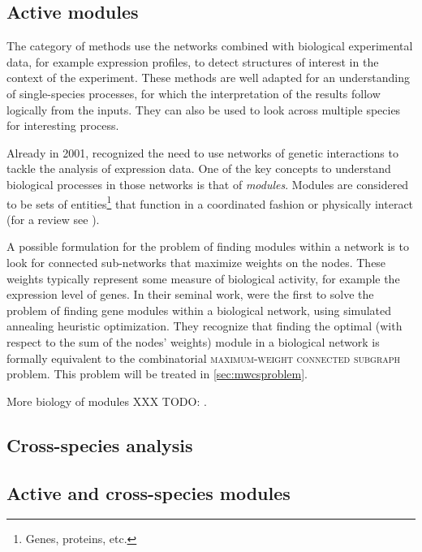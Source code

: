 \subsection{Active modules}

	The category of methods use the networks combined with biological experimental data, for example expression profiles, to detect structures of interest in the context of the experiment.
	These methods are well adapted for an understanding of single-species processes, for which the interpretation of the results follow logically from the inputs.
	They can also be used to look across multiple species for interesting process.

	Already in 2001, \textcite{altman2001whole} recognized the need to use networks of genetic interactions to tackle the analysis of expression data.
	One of the key concepts to understand biological processes in those networks is that of \emph{modules}.
	Modules are considered to be sets of entities\footnote{Genes, proteins, etc.} that function in a coordinated fashion or physically interact (for a review see \textcite{mitra2013integrative}).


	A possible formulation for the problem of finding modules within a network is to look for connected sub-networks that maximize weights on the nodes.
	These weights typically represent some measure of biological activity, for example the expression level of genes.
	In their seminal work, \textcite{ideker2002discovering} were the first to solve the problem of finding gene modules within a biological network, using simulated annealing heuristic optimization.
	They recognize that finding the optimal (with respect to the sum of the nodes' weights) module in a biological network is formally equivalent to the combinatorial \textsc{maximum-weight connected subgraph} problem.
	This problem will be treated in \cref{sec:mwcsproblem}.

	More biology of modules XXX TODO: \parencites{dittrich2008identifying}{yamamoto2009better}{backes2012integer}{mitra2013integrative}.


\subsection{Cross-species analysis}



\subsection{Active and cross-species modules}

